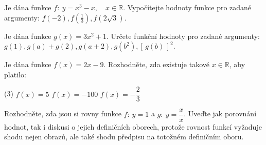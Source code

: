 \documentclass[12pt,a4paper]{article}
\begin{document}
\begin{exercise}
    Je dána funkce \(f:\ y = x^{3} - x,\quad x \in \mathbb{R}\).  
    Vypočítejte hodnoty funkce pro zadané argumenty:
 $f(-2), f\!\left(\tfrac{1}{3}\right), f(2\sqrt{3}).$
\end{exercise}


\begin{exercise}
    Je dána funkce \(g(x)=3x^{2}+1\).  
    Určete funkční hodnoty pro zadané argumenty: $g(1), g(a)+g(2), g(a+2), g(b^{2}), [\,g(b)\,]^{2}$.
\end{exercise}


\begin{exercise}
    Je dána funkce \(f(x)=2x-9\).  
    Rozhodněte, zda existuje takové \(x\in\mathbb{R}\), aby platilo:
    \begin{tasks}(3)
        \task \(f(x)=5\)
        \task \(f(x)=-100\)
        \task \(f(x)=-\dfrac{2}{3}\)
    \end{tasks}
\end{exercise}



\begin{exercise}
    Rozhodněte, zda jsou si rovny funkce \(f:\ y=1\) a \(g:\ y=\dfrac{x}{x}\).
    Uveďte jak porovnání hodnot, tak i diskusi o jejich definičních oborech, protože rovnost funkcí vyžaduje shodu nejen obrazů, ale také shodu předpisu na totožném definičním oboru.
\end{exercise}
\end{document}
